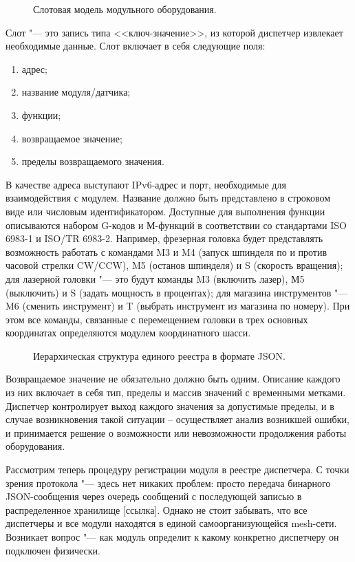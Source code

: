 \begin{figure}[ht]
	\caption{Слотовая модель модульного оборудования.}\label{fig:main-arch}
\end{figure}

Слот "--- это запись типа <<ключ-значение>>, из которой диспетчер извлекает необходимые данные. Слот включает в себя следующие поля:

\begin{enumerate}
	\item адрес;
	\item название модуля/датчика;
	\item функции;
	\item возвращаемое значение;
	\item пределы возвращаемого значения.
\end{enumerate}

В качестве адреса выступают IPv6-адрес и порт, необходимые для взаимодействия с модулем. Название должно быть представлено в строковом виде или числовым идентификатором. Доступные для выполнения функции описываются набором G-кодов и М-функций в соответствии со стандартами ISO 6983-1 и ISO/TR 6983-2.
Например, фрезерная головка будет представлять возможность работать с командами M3 и M4 (запуск шпинделя по и против часовой стрелки CW/CCW), M5 (останов шпинделя) и S (скорость вращения); для лазерной головки "--- это будут команды M3 (включить лазер), М5 (выключить) и S (задать мощность в процентах); для магазина инструментов "--- M6 (сменить инструмент) и T (выбрать инструмент из магазина по номеру).  При этом все команды, связанные с перемещением головки в трех основных координатах определяются модулем координатного шасси.

\begin{figure}[ht]
\caption{Иерархическая структура единого реестра в формате JSON.}\label{fig:json}
\end{figure}

Возвращаемое значение не обязательно должно быть одним. Описание каждого из них включает в себя тип, пределы и массив значений с временными метками. Диспетчер контролирует выход каждого значения за допустимые пределы, и в случае возникновения такой ситуации – осуществляет анализ возникшей ошибки, и принимается решение о возможности или невозможности продолжения работы оборудования.

Рассмотрим теперь процедуру регистрации модуля в реестре диспетчера. С точки зрения протокола "--- здесь нет никаких проблем: просто передача бинарного JSON-сообщения через очередь сообщений с последующей записью в распределенное хранилище [ссылка]. Однако не стоит забывать, что все диспетчеры и все модули находятся в единой самоорганизующейся mesh-сети. Возникает вопрос "--- как модуль определит к какому конкретно диспетчеру он подключен физически.

